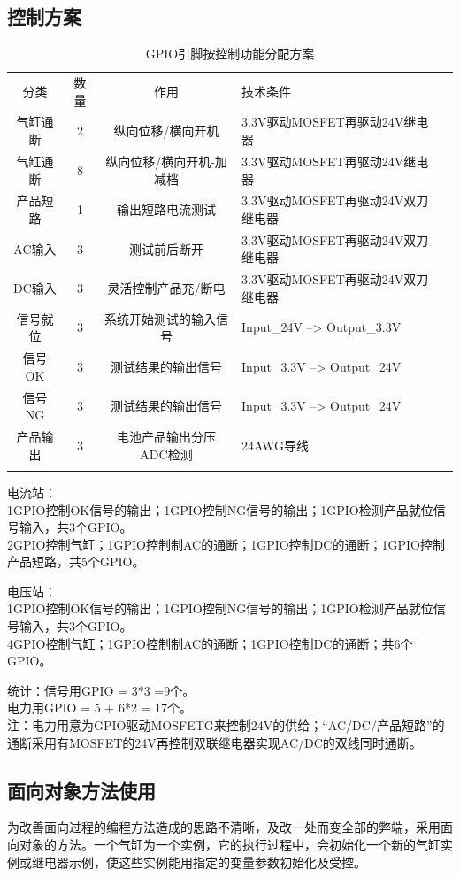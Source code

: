 \documentclass[utf8]{ctexart}
\begin{document}
\subsection {控制方案} 
     \begin{table}[!htbp]
	    \centering
	    \begin{tabular}{ccclc} \Xhline{1.0pt}
		    分类&数量&作用&技术条件\\ 
		     \Xhline{1.0pt} 
		    气缸通断&2&纵向位移/横向开机&3.3V驱动MOSFET再驱动24V继电器 \\
		    气缸通断&8&纵向位移/横向开机-加减档 &3.3V驱动MOSFET再驱动24V继电器 \\
		    产品短路&1&输出短路电流测试&3.3V驱动MOSFET再驱动24V双刀继电器 \\
		    AC输入&3&测试前后断开 &3.3V驱动MOSFET再驱动24V双刀继电器\\
		    DC输入&3&灵活控制产品充/断电 &3.3V驱动MOSFET再驱动24V双刀继电器 \\
		    信号就位&3&系统开始测试的输入信号&Input\_24V --> Output\_3.3V \\
		    信号OK&3&测试结果的输出信号&Input\_3.3V --> Output\_24V \\
		    信号NG&3&测试结果的输出信号&Input\_3.3V --> Output\_24V \\
		    产品输出&3&电池产品输出分压ADC检测&24AWG导线 \\
		   \Xhline{1.0pt}

	\end{tabular}
	\caption{GPIO引脚按控制功能分配方案}
     \end{table}

电流站：\\1GPIO控制OK信号的输出；1GPIO控制NG信号的输出；1GPIO检测产品就位信号输入，共3个GPIO。\\ 2GPIO控制气缸；1GPIO控制制AC的通断；1GPIO控制DC的通断；1GPIO控制产品短路，共5个GPIO。 

电压站：\\1GPIO控制OK信号的输出；1GPIO控制NG信号的输出；1GPIO检测产品就位信号输入，共3个GPIO。\\ 4GPIO控制气缸；1GPIO控制制AC的通断；1GPIO控制DC的通断；共6个GPIO。

统计：信号用GPIO = 3*3 =9个。\\电力用GPIO = 5 + 6*2 = 17个。\\ 注：电力用意为GPIO驱动MOSFETG来控制24V的供给；“AC/DC/产品短路”的通断采用有MOSFET的24V再控制双联继电器实现AC/DC的双线同时通断。

\subsection {面向对象方法使用}
为改善面向过程的编程方法造成的思路不清晰，及改一处而变全部的弊端，采用面向对象的方法。一个气缸为一个实例，它的执行过程中，会初始化一个新的气缸实例或继电器示例，使这些实例能用指定的变量参数初始化及受控。
\end{document}
